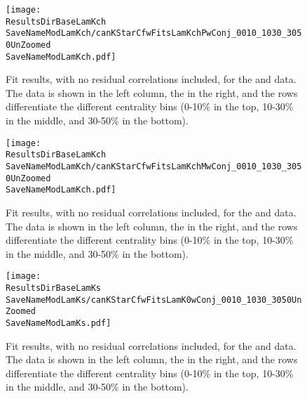 \documentclass[/home/jesse/Analysis/FemtoAnalysis/AnalysisNotes/AnalysisNoteJBuxton.tex]{subfiles}
\renewcommand{\NonFlatBgdLamKch}{_NonFlatBgdCrctnLamK0LinearLamKchPolynomial}
\renewcommand{\NonFlatBgdLamKs}{_NonFlatBgdCrctnLamK0LinearLamKchPolynomial}
\renewcommand{\ResNum}{_NoRes}
\renewcommand{\PrimMaxDecay}{}
\renewcommand{\ResMethod}{}
\renewcommand{\SaveNameModLamKch}{\MomRes\NonFlatBgdLamKch\ResNum\PrimMaxDecay\ResMethod\ParamFixAndShareLamKch}
\renewcommand{\SaveNameModLamKs}{\MomRes\NonFlatBgdLamKs\ResNum\PrimMaxDecay\ResMethod\ParamFixAndShareLamKch}
\begin{document}
\begin{comment}
\begin{figure}[h]
  \centering
  \texttt{[image: \\ResultsDirBaseLamKch\\SaveNameModLamKch/Comparisons/mTscaling\_MinvCalc\_OutlinedPoints\_OthersTransparent\_wJaiAndHans\_NoRes.pdf]}
  \caption[$m_{\mathrm{T}}$ scaling of radii]
  {
  no residual correlations in \LamK fits.  
  Extracted fit $R_{\mathrm{inv}}$ parameters as a function of pair transverse mass ($m_{\mathrm{T}}$) for various pair systems over several centralities. 
  The ALICE published data \cite{Adam:2015vja} are shown with transparent, open symbols.  
  The new \LamK results are shown with opaque, filled symbols.  
  The \mt value for the \LamK system is an average of those for the \LamKchP, \ALamKchM, and \LamKs systems.
  }
  \label{figApp:mTScalingOfRadii_NoRes}
\end{figure}
\end{comment}

\begin{figure}[h]
  \centering
  \texttt{[image: \\ResultsDirBaseLamKch\\SaveNameModLamKch/canKStarCfwFitsLamKchPwConj\_0010\_1030\_3050UnZoomed\\SaveNameModLamKch.pdf]}
  \caption[\LamKchPALamKchM data with fits: no residuals]
  {
  Fit results, with no residual correlations included, for the \LamKchP and \ALamKchM data.
  The \LamKchP data is shown in the left column, the \ALamKchM in the right, and the rows differentiate the different centrality bins (0-10\% in the top, 10-30\% in the middle, and 30-50\% in the bottom).
  }
  \label{figApp:LamKchPwConjFits_NoRes}
\end{figure}


\begin{figure}[h]
  \centering
  \texttt{[image: \\ResultsDirBaseLamKch\\SaveNameModLamKch/canKStarCfwFitsLamKchMwConj\_0010\_1030\_3050UnZoomed\\SaveNameModLamKch.pdf]}
  \caption[\LamKchMALamKchP data with fits: no residuals]
  {
  Fit results, with no residual correlations included, for the \LamKchM and \ALamKchP data.
  The \LamKchM data is shown in the left column, the \ALamKchP in the right, and the rows differentiate the different centrality bins (0-10\% in the top, 10-30\% in the middle, and 30-50\% in the bottom).
  }
  \label{figApp:LamKchMwConjFits_NoRes}
\end{figure}


\begin{figure}[h]
  \centering
  \texttt{[image: \\ResultsDirBaseLamKs\\SaveNameModLamKs/canKStarCfwFitsLamK0wConj\_0010\_1030\_3050UnZoomed\\SaveNameModLamKs.pdf]}
  \caption[\LamALamKs data with fits: no residuals]
  {
  Fit results, with no residual correlations included, for the \LamKs and \ALamKs data.
  The \LamKs data is shown in the left column, the \ALamKs in the right, and the rows differentiate the different centrality bins (0-10\% in the top, 10-30\% in the middle, and 30-50\% in the bottom).
  }
  \label{figApp:LamKswConjFits_NoRes}
\end{figure}
\end{document}
